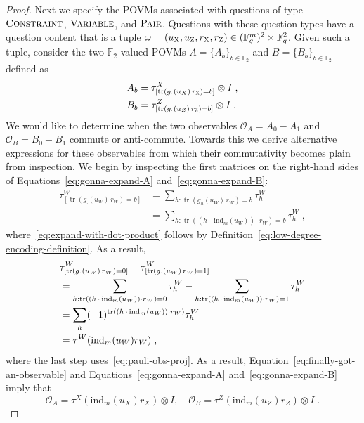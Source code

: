 \documentclass[11pt]{article}
\theoremstyle{definition}
\newcommand{\F}{\ensuremath{\mathbb{F}}}
\newcommand{\ind}{\ensuremath{\mathrm{ind}}}
\DeclareMathOperator{\tr}{tr}
\newcommand{\labelstyle}[1]{\ensuremath{\textsc{#1}}\xspace}
\newcommand{\xpt}{\labelstyle{X}}
\newcommand{\zpt}{\labelstyle{Z}}
\newcommand{\typestyle}[1]{\ensuremath{\textsc{#1}}\xspace}
\newcommand{\Pair}{\typestyle{Pair}}
\newcommand{\Constraint}{\typestyle{Constraint}}
\newcommand{\Variable}{\typestyle{Variable}}
\begin{document}
\begin{proof}
  Next we specify the POVMs associated with questions of type $\Constraint$,
  $\Variable$, and $\Pair$.
  Questions with these question types have a question content that is a tuple
  $\omega= (u_\xpt, u_\zpt, r_\xpt, r_\zpt)\in (\F_q^m)^2 \times \F_q^2$.
  Given such a tuple, consider the two $\F_2$-valued POVMs $A=\{A_b\}_{b \in
    \F_2}$ and $B=\{B_b\}_{b \in \F_2}$ defined as
  \begin{align}
    A_b & = \tau^X_{[\tr(g_{\cdot}(u_X)\, r_\xpt) = b]} \otimes I\;,\label{eq:gonna-expand-A}\\
    B_b & = \tau^Z_{[\tr(g_{\cdot}(u_Z)\, r_\zpt) = b]} \otimes I\;.\label{eq:gonna-expand-B}
  \end{align}
  We would like to determine when the two observables $\mathcal{O}_A = A_0 -
  A_1$ and $\mathcal{O}_B = B_0 - B_1$ commute or anti-commute.
  Towards this we derive alternative expressions for these observables from
  which their commutativity becomes plain from inspection.
  We begin by inspecting the first matrices on the right-hand sides of
  Equations~\eqref{eq:gonna-expand-A} and~\eqref{eq:gonna-expand-B}:
  \begin{align}
  \tau^W_{[\tr(g_{\cdot}(u_W)\, r_W) = b]}
  &= \sum_{h : \tr(g_{h}(u_W)\, r_W) = b} \tau^W_h\nonumber\\
  &= \sum_{h : \tr((h\, \cdot\, \ind_{m}(u_W)) \cdot r_W ) = b} \tau^W_h\;,\label{eq:expand-with-dot-product}
  \end{align}
  where~\eqref{eq:expand-with-dot-product}
  follows by  Definition~\ref{eq:low-degree-encoding-definition}.
  As a result,
  \begin{align}
&  \tau^W_{[\tr(g_{\cdot}(u_W)\, r_W) = 0]}
  -   \tau^W_{[\tr(g_{\cdot}(u_W)\, r_W) = 1]} \notag \\
  & = \sum_{h : \tr((h\, \cdot\, \ind_{m}(u_W)) \cdot r_W ) = 0} \tau^W_h
  	- \sum_{h : \tr((h\, \cdot\, \ind_{m}(u_W)) \cdot r_W ) = 1} \tau^W_h\nonumber\\
  & = \sum_{h} (-1)^{\tr((h\, \cdot\, \ind_{m}(u_W)) \cdot r_W )} \tau^W_h\nonumber\\
  & = \tau^W(\ind_{m}(u_W)r_W)\;,\label{eq:finally-got-an-observable}
  \end{align}
  where the last step uses~\eqref{eq:pauli-obs-proj}.
  As a result, Equation~\eqref{eq:finally-got-an-observable}
  and Equations~\eqref{eq:gonna-expand-A} and~\eqref{eq:gonna-expand-B} imply that
  \begin{equation*}
  \mathcal{O}_A = \tau^X(\ind_{m}(u_X)r_X) \otimes I,\quad
  \mathcal{O}_B = \tau^Z(\ind_{m}(u_Z)r_Z) \otimes I\;.

\end{equation*}
\end{proof}
\end{document}
